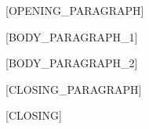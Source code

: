 \documentclass{cover}
\begin{document}
\makeheader
\makesubject

\begin{coverbody}
[GREETING]

[OPENING_PARAGRAPH]

[BODY_PARAGRAPH_1]

[BODY_PARAGRAPH_2]

[CLOSING_PARAGRAPH]

[CLOSING]
\end{coverbody}
\end{document}
